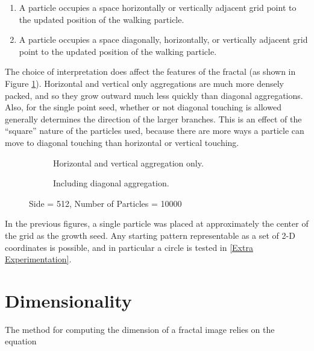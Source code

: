 \documentclass[12pt]{article}
\begin{document}
\begin{enumerate}
\item{A particle occupies a space horizontally or vertically adjacent grid point to the updated position of the walking particle.}
\item{A particle occupies a space diagonally, horizontally, or vertically adjacent grid point to the updated position of the walking particle.}
\end{enumerate}

The choice of interpretation does affect the features of the fractal (as shown in Figure \ref{hdv}).
Horizontal and vertical only aggregations are much more densely packed, and so they grow outward much less quickly than diagonal aggregations.
Also, for the single point seed, whether or not diagonal touching is allowed generally determines the direction of the larger branches.
This is an effect of the ``square'' nature of the particles used, because there are more ways a particle can move to diagonal touching than horizontal or vertical touching.

\begin{figure}[h]
  \centering

  \begin{subfigure}[b]{0.45\textwidth}
    \caption{Horizontal and vertical aggregation only.}
  \end{subfigure}
  \qquad
  \begin{subfigure}[b]{0.45\textwidth}
    \caption{Including diagonal aggregation.}
  \end{subfigure}

  \caption{Side = 512, Number of Particles = 10000}
  \label{hdv}

\end{figure}

In the previous figures, a single particle was placed at approximately the center of the grid as the growth seed.
Any starting pattern representable as a set of 2-D coordinates is possible, and in particular a circle is tested in \ref{Extra Experimentation}.


\section*{Dimensionality}


The method for computing the dimension of a fractal image relies on the equation
\end{document}
